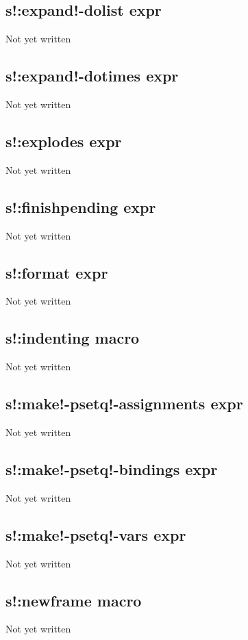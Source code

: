 \documentclass[a4paper,11pt]{article}
\begin{document}
{\subsection{\ttfamily s!:expand!-dolist expr}
Not yet written

\subsection{\ttfamily s!:expand!-dotimes expr}
Not yet written

\subsection{\ttfamily s!:explodes expr}
Not yet written

\subsection{\ttfamily s!:finishpending expr}
Not yet written

\subsection{\ttfamily s!:format expr}
Not yet written

\subsection{\ttfamily s!:indenting macro}
Not yet written

\subsection{\ttfamily s!:make!-psetq!-assignments expr}
Not yet written

\subsection{\ttfamily s!:make!-psetq!-bindings expr}
Not yet written

\subsection{\ttfamily s!:make!-psetq!-vars expr}
Not yet written

\subsection{\ttfamily s!:newframe macro}
Not yet written

}
\end{document}
